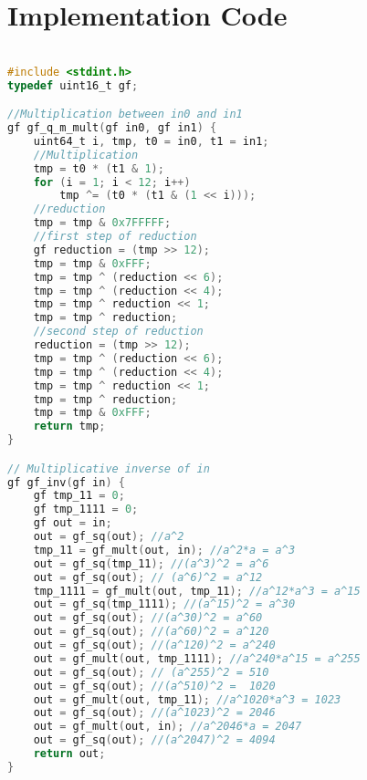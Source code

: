 \documentclass[brazil, english]{ufsc-thesis}
\begin{document}
\postextual


\appendix
\chapter{Implementation Code}
\begin{lstlisting}[caption={Multiplication of two elements in $\mathbb{F}_{2^{12}}$ and inversion of an element in $\mathbb{F}_{2^{12}}$},label={lst:label},language=C]

#include <stdint.h>
typedef uint16_t gf;

//Multiplication between in0 and in1
gf gf_q_m_mult(gf in0, gf in1) {
    uint64_t i, tmp, t0 = in0, t1 = in1;
    //Multiplication
    tmp = t0 * (t1 & 1);
    for (i = 1; i < 12; i++)
        tmp ^= (t0 * (t1 & (1 << i)));
    //reduction
    tmp = tmp & 0x7FFFFF;
    //first step of reduction
    gf reduction = (tmp >> 12);
    tmp = tmp & 0xFFF;
    tmp = tmp ^ (reduction << 6);
    tmp = tmp ^ (reduction << 4);
    tmp = tmp ^ reduction << 1;
    tmp = tmp ^ reduction;
    //second step of reduction
    reduction = (tmp >> 12);
    tmp = tmp ^ (reduction << 6);
    tmp = tmp ^ (reduction << 4);
    tmp = tmp ^ reduction << 1;
    tmp = tmp ^ reduction;
    tmp = tmp & 0xFFF;
    return tmp;
}

// Multiplicative inverse of in
gf gf_inv(gf in) {
    gf tmp_11 = 0;
    gf tmp_1111 = 0;
    gf out = in;
    out = gf_sq(out); //a^2
    tmp_11 = gf_mult(out, in); //a^2*a = a^3
    out = gf_sq(tmp_11); //(a^3)^2 = a^6
    out = gf_sq(out); // (a^6)^2 = a^12
    tmp_1111 = gf_mult(out, tmp_11); //a^12*a^3 = a^15
    out = gf_sq(tmp_1111); //(a^15)^2 = a^30
    out = gf_sq(out); //(a^30)^2 = a^60
    out = gf_sq(out); //(a^60)^2 = a^120
    out = gf_sq(out); //(a^120)^2 = a^240
    out = gf_mult(out, tmp_1111); //a^240*a^15 = a^255
    out = gf_sq(out); // (a^255)^2 = 510
    out = gf_sq(out); //(a^510)^2 =  1020
    out = gf_mult(out, tmp_11); //a^1020*a^3 = 1023
    out = gf_sq(out); //(a^1023)^2 = 2046
    out = gf_mult(out, in); //a^2046*a = 2047
    out = gf_sq(out); //(a^2047)^2 = 4094
    return out;
}
\end{lstlisting}
\end{document}
